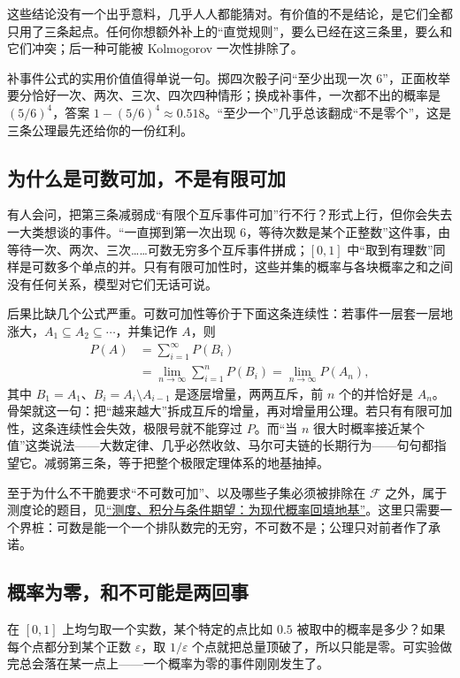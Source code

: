 这些结论没有一个出乎意料，几乎人人都能猜对。有价值的不是结论，是它们全都只用了三条起点。任何你想额外补上的``直觉规则''，要么已经在这三条里，要么和它们冲突；后一种可能被 Kolmogorov 一次性排除了。

补事件公式的实用价值值得单说一句。掷四次骰子问``至少出现一次 \(6\)''，正面枚举要分恰好一次、两次、三次、四次四种情形；换成补事件，一次都不出的概率是 \((5/6)^4\)，答案 \(1-(5/6)^4\approx0.518\)。``至少一个''几乎总该翻成``不是零个''，这是三条公理最先还给你的一份红利。

\subsection{为什么是可数可加，不是有限可加}

有人会问，把第三条减弱成``有限个互斥事件可加''行不行？形式上行，但你会失去一大类想谈的事件。``一直掷到第一次出现 \(6\)，等待次数是某个正整数''这件事，由等待一次、两次、三次……可数无穷多个互斥事件拼成；\([0,1]\) 中``取到有理数''同样是可数多个单点的并。只有有限可加性时，这些并集的概率与各块概率之和之间没有任何关系，模型对它们无话可说。

后果比缺几个公式严重。可数可加性等价于下面这条连续性：若事件一层套一层地涨大，\(A_1\subseteq A_2\subseteq\cdots\)，并集记作 \(A\)，则
\[
\begin{aligned}
P(A)&=\sum_{i=1}^{\infty}P(B_i)\\
&=\lim_{n\to\infty}\sum_{i=1}^{n}P(B_i)
=\lim_{n\to\infty}P(A_n),
\end{aligned}
\]
其中 \(B_1=A_1\)、\(B_i=A_i\setminus A_{i-1}\) 是逐层增量，两两互斥，前 \(n\) 个的并恰好是 \(A_n\)。骨架就这一句：把``越来越大''拆成互斥的增量，再对增量用公理。若只有有限可加性，这条连续性会失效，极限号就不能穿过 \(P\)。而``当 \(n\) 很大时概率接近某个值''这类说法——大数定律、几乎必然收敛、马尔可夫链的长期行为——句句都指望它。减弱第三条，等于把整个极限定理体系的地基抽掉。

至于为什么不干脆要求``不可数可加''、以及哪些子集必须被排除在 \(\mathcal F\) 之外，属于测度论的题目，见\hyperref[ch:101]{``测度、积分与条件期望：为现代概率回填地基''}。这里只需要一个界桩：可数是能一个一个排队数完的无穷，不可数不是；公理只对前者作了承诺。

\subsection{概率为零，和不可能是两回事}

在 \([0,1]\) 上均匀取一个实数，某个特定的点比如 \(0.5\) 被取中的概率是多少？如果每个点都分到某个正数 \(\varepsilon\)，取 \(1/\varepsilon\) 个点就把总量顶破了，所以只能是零。可实验做完总会落在某一点上——一个概率为零的事件刚刚发生了。

